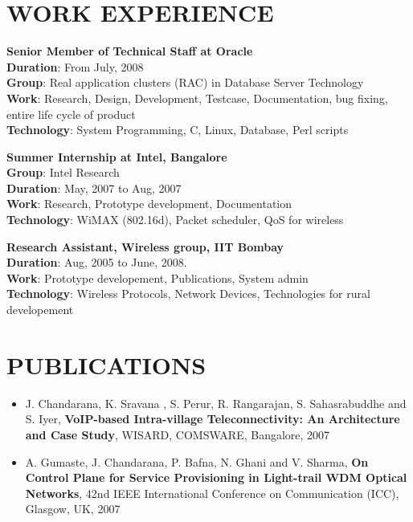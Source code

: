 \documentclass{res}
\begin{document}
\begin{resume}
					  \section{WORK EXPERIENCE} 
					  {\bf Senior Member of Technical Staff at Oracle}
					  \\{\bf Duration}:  From July, 2008\\
					  {\bf Group}: Real application clusters (RAC) in Database Server Technology\\ 
					  {\bf Work}: Research, Design, Development, Testcase, Documentation, bug fixing, entire life cycle of product\\
					  {\bf Technology}: System Programming, C, Linux, Database, Perl scripts

					  {\bf Summer Internship at Intel, Bangalore}\\
					  {\bf Group}: Intel Research 
					  \\{\bf Duration}: May, 2007 to Aug, 2007
					  \\{\bf Work}: Research, Prototype development, Documentation
					  \\{\bf Technology}: WiMAX (802.16d), Packet scheduler, QoS for wireless


					  {\bf Research Assistant, Wireless group, IIT Bombay} 
					  \\{\bf Duration}: Aug, 2005 to June, 2008.
					  \\{\bf Work}: Prototype developement, Publications, System admin
					  \\{\bf Technology}: Wireless Protocols, Network Devices, Technologies for rural developement  

					  \vspace{0.2in} 

				      \section{PUBLICATIONS} 
					  \begin{itemize}
					  \item  J. Chandarana, K. Sravana , S. Perur, R. Rangarajan, S. Sahasrabuddhe and S. Iyer, {\bf VoIP-based
					  Intra-village Teleconnectivity: An Architecture and Case Study}, WISARD, COMSWARE,
					  Bangalore, 2007

					  \item A. Gumaste, J. Chandarana, P. Bafna, N. Ghani and V. Sharma, {\bf On Control Plane for Service
					  Provisioning in Light-trail WDM Optical Networks}, 42nd IEEE International Conference on
					  Communication (ICC), Glasgow, UK, 2007


\end{itemize}
\end{resume}
\end{document}
